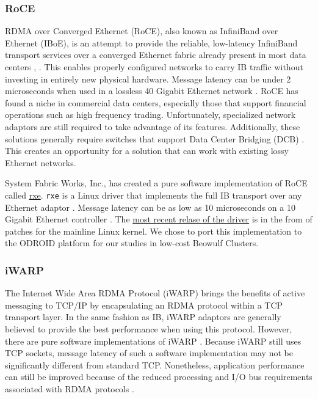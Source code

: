\documentclass[11pt]{book}
\begin{document}
\subsubsection{\textbf{RoCE}}

RDMA over Converged Ethernet (RoCE), also known as InfiniBand over Ethernet
(IBoE), is an attempt to provide the reliable, low-latency InfiniBand transport
services over a converged Ethernet fabric already present in most data centers
\cite{InfiniBandTARoCE-10}, \cite{roce-announce}. This enables properly
configured networks to carry IB traffic without investing in entirely new
physical hardware. Message latency can be under 2 microseconds when used in a
lossless 40 Gigabit Ethernet network \cite{vienne-12}. RoCE has found a niche in
commercial data centers, especially those that support financial operations such
as high frequency trading. Unfortunately, specialized network adaptors are still
required to take advantage of its features. Additionally, these solutions
generally require switches that support Data Center Bridging (DCB)
\cite{InfiniBandTARoCE-10}. This creates an opportunity for a solution that can
work with existing lossy Ethernet networks.

System Fabric Works, Inc., has created a pure software implementation of RoCE
called \href{http://www.systemfabricworks.com/downloads/roce}{rxe}. \verb;rxe;
is a Linux driver that implements the full IB transport over any Ethernet
adaptor \cite{pearson-10}. Message latency can be as low as 10
microseconds on a 10 Gigabit Ethernet controller \cite{pearson-10}. The
\href{http://support.systemfabricworks.com/downloads/rxe/}{most recent relase of
  the driver} is in the from of patches for the mainline Linux kernel. We chose
to port this implementation to the ODROID platform for our studies in low-cost
Beowulf Clusters.

\subsubsection{\textbf{iWARP}}

The Internet Wide Area RDMA Protocol (iWARP) brings the benefits of active
messaging to TCP/IP by encapsulating an RDMA protocol within a TCP transport
layer. In the same fashion as IB, iWARP adaptors are generally believed to
provide the best performance when using this protocol. However, there are pure
software implementations of iWARP \cite{neeser-10}. Because iWARP still uses TCP
sockets, message latency of such a software implementation may not be
significantly different from standard TCP. Nonetheless, application performance
can still be improved because of the reduced processing and I/O bus requirements
associated with RDMA protocols \cite{narravula-07}.
\end{document}
